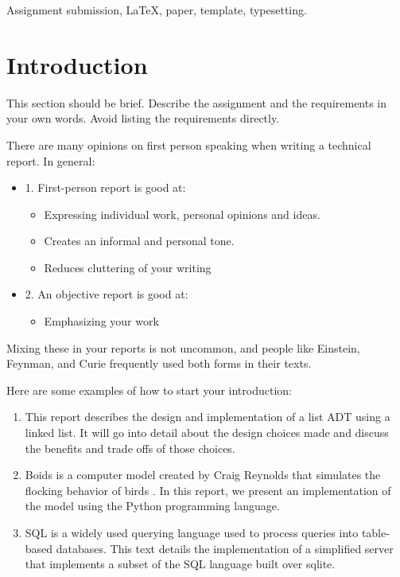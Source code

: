 \documentclass[conference]{IEEEtran}
\begin{document}
\begin{IEEEkeywords}
	Assignment submission, \LaTeX, paper, template, typesetting.
\end{IEEEkeywords}

\section{Introduction}
\label{Section:Introduction}
This section should be brief. Describe the assignment and the requirements in your own words. Avoid listing the requirements directly.


There are many opinions on first person speaking when writing a technical report. In general:

\begin{itemize}
	\item 1. First-person report is good at:
	      \begin{itemize}
		      \item Expressing individual work, personal opinions and ideas.
		      \item Creates an informal and personal tone.
		      \item Reduces cluttering of your writing
	      \end{itemize}
	\item 2. An objective report is good at:
	      \begin{itemize}
		      \item Emphasizing your work
	      \end{itemize}
\end{itemize}


Mixing these in your reports is not uncommon, and people like Einstein, Feynman, and Curie frequently used both forms in their texts.


Here are some examples of how to start your introduction:

\begin{enumerate}
	\item This report describes the design and implementation of a list ADT using a linked list. It will go into detail about the design choices made and discuss the benefits and trade offs of those choices.
	\item Boids is a computer model created by Craig Reynolds that simulates the flocking behavior of birds \cite{TanenbaumAndrewS.2024Mos}. In this report, we present an implementation of the model using the Python programming language.
	\item SQL is a widely used querying language used to process queries into table-based databases. This text details the implementation of a simplified server that implements a subset of the SQL language built over sqlite.
\end{enumerate}
\end{document}

